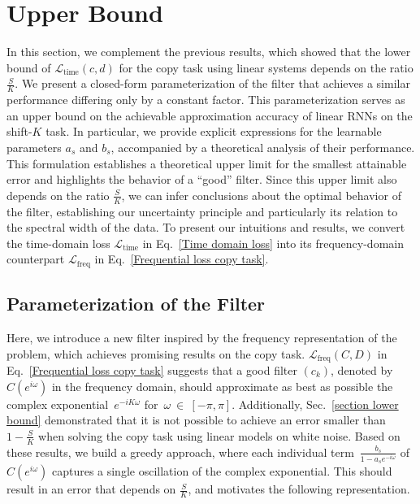 \section{Upper Bound}\label{section upper bound}

In this section, we complement the previous results, which showed that the lower bound of $\mathcal{L}_\text{time}(c, d)$ for the copy task using linear systems depends on the ratio \(\frac{S}{K}\). We present a closed-form parameterization of the filter that achieves a similar performance differing only by a constant factor. This parameterization serves as an upper bound on the achievable approximation accuracy of linear RNNs on the shift-$K$ task. In particular, we provide explicit expressions for the learnable parameters \(a_s\) and \(b_s\), accompanied by a theoretical analysis of their performance. This formulation establishes a theoretical upper limit for the smallest attainable error and highlights the behavior of a ``good'' filter. Since this upper limit also depends on the ratio \(\frac{S}{K}\), we can infer conclusions about the optimal behavior of the filter, establishing our uncertainty principle and particularly its relation to the spectral width of the data. 
To present our intuitions and results, we convert the time-domain loss $\mathcal{L}_\text{time}$ in Eq.~\eqref{Time domain loss} into its frequency-domain counterpart $\mathcal{L}_\text{freq}$ in Eq.~\eqref{Frequential loss copy task}.



\subsection{Parameterization of the Filter}

Here, we introduce a new filter inspired by the frequency representation of the problem, which achieves promising results on the copy task. $\mathcal{L}_\text{freq}(C, D)$ in Eq.~\eqref{Frequential loss copy task} suggests that a good filter $(c_k)$, denoted by $C(e^{i\omega})$ in the frequency domain, should approximate as best as possible the complex exponential~$e^{-iK\omega}$ for~$\omega~\in~[-\pi,\pi]$.
Additionally, Sec.~\ref{section lower bound} demonstrated that it is not possible to achieve an error smaller than \(1-\frac{S}{K}\) when solving the copy task using linear models on white noise.  Based on these results, we build a greedy approach, where each individual term~\(\frac{b_s}{1-a_se^{-i\omega}}\) of~$C(e^{i\omega})$ captures a single oscillation of the complex exponential. This should result in an error that depends on \(\frac{S}{K}\), and motivates the following representation.


